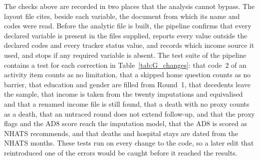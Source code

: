 The checks above are recorded in two places that the analysis cannot bypass.
The layout file cites, beside each variable, the document from which its name
and codes were read. Before the analytic file is built, the pipeline confirms
that every declared variable is present in the files supplied, reports every
value outside the declared codes and every tracker status value, and records
which income source it used, and stops if
any required variable is absent. The test suite of the pipeline contains a
test for each correction in Table~\ref{tab:G_changes}: that code~2 of an
activity item counts as no limitation, that a skipped home question counts as
no barrier, that education and gender are filled from Round~1, that decedents
leave the sample, that income is taken from the twenty imputations and
equivalised and that a renamed income file is still found, that a death with
no proxy counts as a death, that an untraced round does not extend follow-up,
and that the proxy flags and the AD8 score reach the imputation model, that the
AD8 is scored as NHATS recommends, and that deaths and hospital stays are
dated from the NHATS months. These tests run on every change to the code, so a later edit
that reintroduced one of the errors would be caught before it reached the
results.
